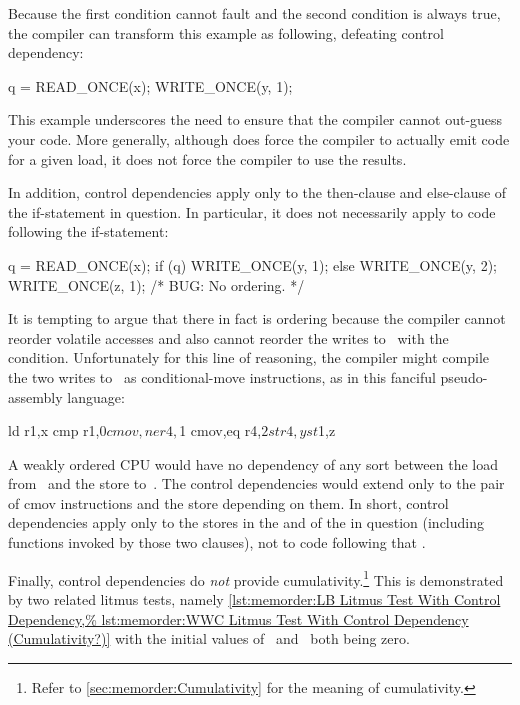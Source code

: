 Because the first condition cannot fault and the second condition is
always true, the compiler can transform this example as following,
defeating control dependency:

\begin{VerbatimN}
q = READ_ONCE(x);
WRITE_ONCE(y, 1);
\end{VerbatimN}

This example underscores the need to ensure that the compiler cannot
out-guess your code.
More generally, although  does force
the compiler to actually emit code for a given load, it does not force
the compiler to use the results.

In addition, control dependencies apply only to the then-clause and
else-clause of the if-statement in question.
In particular, it does
not necessarily apply to code following the if-statement:

\begin{VerbatimN}
q = READ_ONCE(x);
if (q) {
	WRITE_ONCE(y, 1);
} else {
	WRITE_ONCE(y, 2);
}
WRITE_ONCE(z, 1);  /* BUG: No ordering. */
\end{VerbatimN}

It is tempting to argue that there in fact is ordering because the
compiler cannot reorder volatile accesses and also cannot reorder
the writes to~ with the condition.
Unfortunately for this line
of reasoning, the compiler might compile the two writes to~ as
conditional-move instructions, as in this fanciful pseudo-assembly
language:

\begin{VerbatimN}
ld r1,x
cmp r1,$0
cmov,ne r4,$1
cmov,eq r4,$2
st r4,y
st $1,z
\end{VerbatimN}

A weakly ordered CPU would have no dependency of any sort between the load
from~ and the store to~.
The control dependencies would extend
only to the pair of cmov instructions and the store depending on them.
In short, control dependencies apply only to the stores in the 
and  of the  in question (including functions
invoked by those two clauses), not to code following that .

Finally, control dependencies do \emph{not} provide cumulativity.\footnote{
	Refer to \cref{sec:memorder:Cumulativity} for
	the meaning of cumulativity.}
This is demonstrated by two related litmus tests, namely
\cref{lst:memorder:LB Litmus Test With Control Dependency,%
lst:memorder:WWC Litmus Test With Control Dependency (Cumulativity?)}
with the initial values
of~ and~ both being zero.

